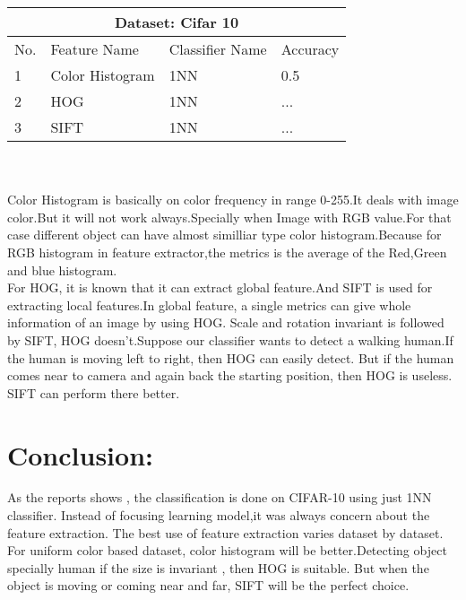 \documentclass[12pt,a4paper] {article}
\begin{document}
	\begin{tabular}{ |p{1cm}||p{3cm}|p{3cm}|p{3cm}|  }
		\hline
		\multicolumn{4}{|c|}{ Dataset: Cifar 10 } \\
		\hline
		 	No. & Feature Name & Classifier Name & Accuracy \\
		\hline
			1 & Color Histogram & 1NN & 0.5 \\
			2 & HOG             & 1NN & ... \\
			3 & SIFT            & 1NN & ... \\
		\hline
	\end{tabular}
	\\ \\
	Color Histogram is basically on color frequency in range 0-255.It deals with image color.But it will not work always.Specially when
	Image with RGB value.For that case different object can have almost similliar type color histogram.Because for RGB histogram in feature
	extractor,the metrics is the average of the Red,Green and blue histogram. \\

	For HOG, it is known that it can extract global feature.And SIFT is used for extracting local features.In global feature, a single 
	metrics can give whole information of an image by using HOG. Scale and rotation invariant is followed by SIFT, HOG doesn't.Suppose 
	our classifier wants to detect a walking human.If the human is moving left to right, then HOG can easily detect. But if the human
	comes near to camera and again back the starting position, then HOG is useless. SIFT can perform there better.


	\section{Conclusion:}
	As the reports shows , the classification is done on CIFAR-10 using just 1NN classifier. Instead of focusing learning model,it was
	always concern about the feature extraction. The best use of feature extraction varies dataset by dataset. For uniform color based 
	dataset, color histogram will be better.Detecting object specially human if the size is invariant , then HOG is suitable. But when
	the object is moving or coming near and far, SIFT will be the perfect choice. 
\end{document}
